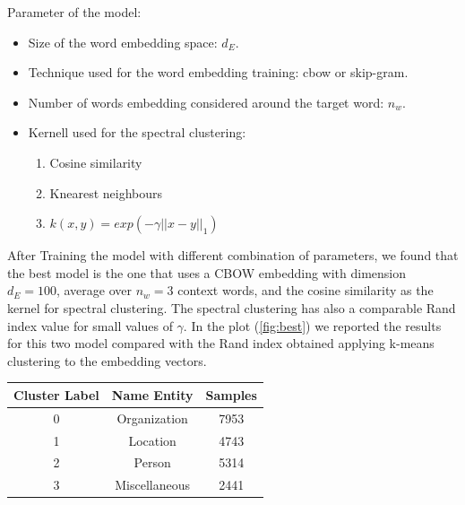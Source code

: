 \documentclass[]{article}
\begin{document}
Parameter of the model:
\begin{itemize}  \label{confusion} 
	\item Size of the word  embedding space: $d_E$.
	\item Technique used for the word embedding training: cbow  or skip-gram.
	\item Number of words embedding considered around the target word: $n_w$.
	\item Kernell used for the spectral clustering:
	\begin{enumerate}
		\item Cosine similarity 
		\item Knearest neighbours 
		\item $k(x,y)=exp(-\gamma ||x-y||_1)$
	\end{enumerate} 

\end{itemize}  
After Training the model with different combination of parameters, we found that the best model is the one that uses a CBOW embedding with dimension $d_E=100$, average over $n_w=3$ context words, and the cosine similarity as the kernel for spectral clustering. The spectral clustering has also a comparable Rand index value for small values of $\gamma$. In the plot (\ref{fig:best}) we reported the results for this two model compared with the Rand index obtained applying k-means clustering to the embedding vectors. 

\begin{center}
	\begin{tabular}{ |c|c|c|} 
		\hline
		Cluster Label & Name Entity & Samples\\
		\hline
	0 & Organization & 7953\\
		\hline
1 & Location & 4743\\
		\hline
 2 & Person & 5314\\
		\hline
 3 & Miscellaneous & 2441\\
		\hline
	\end{tabular}
\end{center}
\end{document}
